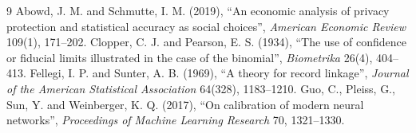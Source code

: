 \documentclass[10pt,a4paper]{article}
\theoremstyle{plain}
\begin{document}
\begin{thebibliography}{9}\small
{} Abowd, J. M. and Schmutte, I. M. (2019), ``An economic analysis of privacy protection and statistical accuracy as social choices'', \emph{American Economic Review} 109(1), 171--202.
 Clopper, C. J. and Pearson, E. S. (1934), ``The use of confidence or fiducial limits illustrated in the case of the binomial'', \emph{Biometrika} 26(4), 404--413.
 Fellegi, I. P. and Sunter, A. B. (1969), ``A theory for record linkage'', \emph{Journal of the American Statistical Association} 64(328), 1183--1210.
 Guo, C., Pleiss, G., Sun, Y. and Weinberger, K. Q. (2017), ``On calibration of modern neural networks'', \emph{Proceedings of Machine Learning Research} 70, 1321--1330.
\end{thebibliography}
\end{document}
